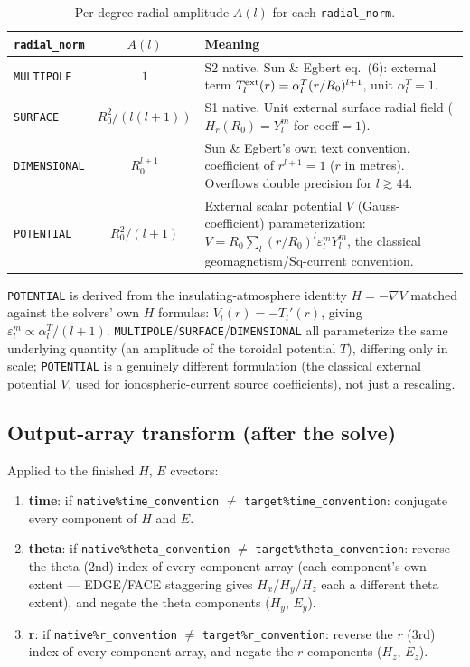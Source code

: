 \documentclass[11pt]{article}
\begin{document}
\begin{table}[h]
\centering
\small
\begin{tabular}{@{}lcp{8.2cm}@{}}
\toprule
\texttt{radial\_norm} & $A(l)$ & Meaning \\
\midrule
\texttt{MULTIPOLE}   & $1$              & S2 native. Sun \& Egbert eq.~(6): external term $T_l^{\rm ext}(r)=\alpha_l^T(r/R_0)^{l+1}$, unit $\alpha_l^T=1$. \\[2pt]
\texttt{SURFACE}     & $R_0^2/(l(l{+}1))$ & S1 native. Unit external surface radial field ($H_r(R_0)=Y_l^m$ for coeff$=1$). \\[2pt]
\texttt{DIMENSIONAL} & $R_0^{l+1}$      & Sun \& Egbert's own text convention, coefficient of $r^{l+1}=1$ ($r$ in metres). Overflows double precision for $l\gtrsim44$. \\[2pt]
\texttt{POTENTIAL}   & $R_0^2/(l{+}1)$  & External scalar potential $V$ (Gauss-coefficient) parameterization: $V=R_0\sum_l(r/R_0)^l\varepsilon_l^m Y_l^m$, the classical geomagnetism/Sq-current convention. \\
\bottomrule
\end{tabular}
\caption{Per-degree radial amplitude $A(l)$ for each \texttt{radial\_norm}.}
\end{table}

\texttt{POTENTIAL} is derived from the insulating-atmosphere identity $H=-\nabla V$ matched against
the solvers' own $H$ formulas: $V_l(r)=-T_l'(r)$, giving $\varepsilon_l^m \propto \alpha_l^T/(l+1)$.
\texttt{MULTIPOLE}/\texttt{SURFACE}/\texttt{DIMENSIONAL} all parameterize the same underlying
quantity (an amplitude of the toroidal potential $T$), differing only in scale; \texttt{POTENTIAL}
is a genuinely different formulation (the classical external potential $V$, used for
ionospheric-current source coefficients), not just a rescaling.

\subsection{Output-array transform (after the solve)}
\label{sec:transform43}

Applied to the finished $H$, $E$ cvectors:

\begin{enumerate}
\item \textbf{time}: if \texttt{native\%time\_convention} $\ne$ \texttt{target\%time\_convention}:
conjugate every component of $H$ and $E$.
\item \textbf{theta}: if \texttt{native\%theta\_convention} $\ne$ \texttt{target\%theta\_convention}:
reverse the theta (2nd) index of every component array (each component's own extent --- EDGE/FACE
staggering gives $H_x$/$H_y$/$H_z$ each a different theta extent), and negate the theta components
($H_y$, $E_y$).
\item \textbf{r}: if \texttt{native\%r\_convention} $\ne$ \texttt{target\%r\_convention}: reverse
the $r$ (3rd) index of every component array, and negate the $r$ components ($H_z$, $E_z$).
\end{enumerate}
\end{document}

